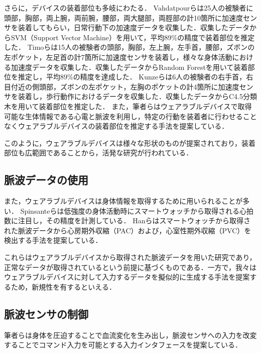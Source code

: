 \documentclass[submit,techrep]{ipsj}
\begin{document}
さらに，デバイスの装着部位も多岐にわたる．
Vahdatpourら\cite{localization_vahdatpour}は25人の被験者に頭部，胸部，両上腕，両前腕，腰部，両大腿部，両脛部の計10箇所に加速度センサを装着してもらい，日常行動下の加速度データを収集した．収集したデータからSVM（Support Vector Machine）を用いて，平均89\%の精度で装着部位を推定した．
Timoら\cite{localization_timo}は15人の被験者の頭部，胸部，左上腕，左手首，腰部，ズボンの左ポケット，左足首の計7箇所に加速度センサを装着し，様々な身体活動における加速度データを収集した．収集したデータからRandom Forestを用いて装着部位を推定し，平均89\%の精度を達成した．
Kunzeら\cite{localization_kunze}は6人の被験者の右手首，右目付近の側頭部，ズボンの左ポケット，左胸のポケットの計4箇所に加速度センサを装着し，歩行動作におけるデータを収集した．収集したデータからC4.5分類木を用いて装着部位を推定した．
また，筆者ら\cite{localization_yoshida}はウェアラブルデバイスで取得可能な生体情報である心電と脈波を利用し，特定の行動を装着者に行わせることなくウェアラブルデバイスの装着部位を推定する手法を提案している．
\par

このように，ウェアラブルデバイスは様々な形状のものが提案されており，装着部位も広範囲であることから，活発な研究が行われている．


\subsection{脈波データの使用}
また，ウェアラブルデバイスは身体情報を取得するために用いられることが多い．
Spinsanteら\cite{accuracy_in_low_intensity}は低強度の身体活動時にスマートウォッチから取得される心拍数に注目し，その精度を計測している．
Hanら\cite{arrhythmia_detection}はスマートウォッチから取得された脈波データから心房期外収縮（PAC）および，心室性期外収縮（PVC）を検出する手法を提案している．
\par

これらはウェアラブルデバイスから取得された脈波データを用いた研究であり，正常なデータが取得されているという前提に基づくものである．一方で，我々はウェアラブルデバイスに対して入力するデータを擬似的に生成する手法を提案するため，新規性を有するといえる．


\subsection{脈波センサの制御}
筆者ら\cite{akimoto}は身体を圧迫することで血流変化を生み出し，脈波センサへの入力を改変することでコマンド入力を可能とする入力インタフェースを提案している．
\par
\end{document}
